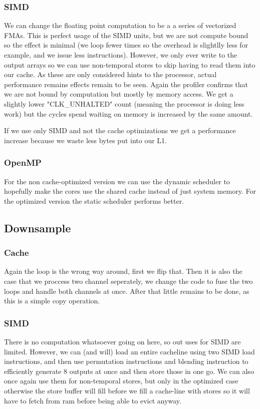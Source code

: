 \documentclass{article}
\begin{document}
\subsubsection{SIMD}
We can change the floating point computation to be a a series of vectorized FMAs. This is perfect usage of the SIMD units, but we are not compute bound so the effect is minimal (we loop fewer times so the overhead is slightlly less for example, and we issue less instructions).
However, we only ever write to the output arrays so we can use non-temporal stores to skip having to read them into our cache. As these are only considered hints to the processor, actual performance remains effects remain to be seen. Again the profiler confirms that we are not bound by computation but mostly by memory access.
We get a slightly lower "CLK\_UNHALTED" count (meaning the processor is doing less work) but the cycles spend waiting on memory is increased by the same amount.
\par If we use only SIMD and not the cache optimizations we get a performance increase because we waste less bytes put into our L1.
\subsubsection{OpenMP}
For the non cache-optimized version we can use the dynamic scheduler to hopefully make the cores use the shared cache instead of just system memory. For the optimized version the static scheduler performs better.

\subsection{Downsample}
\subsubsection{Cache}
Again the loop is the wrong way around, first we flip that. Then it is also the case that we proccess two channel seperately, we change the code to fuse the two loops and handle both channels at once.
After that little remains to be done, as this is a simple copy operation.
\subsubsection{SIMD}
There is no computation whatsoever going on here, so out uses for SIMD are limited. However, we can (and will) load an entire cacheline using two SIMD load instructions, and then use permutation instructions and blending instruction to efficiently generate 8 outputs at once and then store those in one go.
We can also once again use them for non-temporal stores, but only in the optimized case otherwise the store buffer will fill before we fill a cache-line with stores so it will have to fetch from ram before being able to evict anyway.
\end{document}
